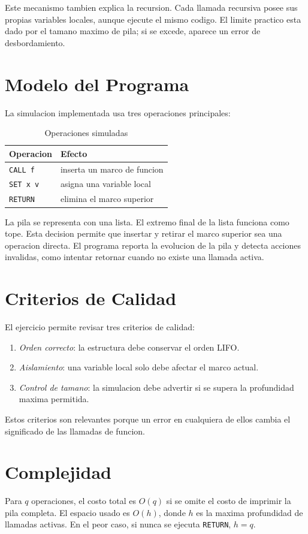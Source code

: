 \documentclass[conference]{IEEEtran}
\begin{document}
Este mecanismo tambien explica la recursion. Cada llamada recursiva posee sus
propias variables locales, aunque ejecute el mismo codigo. El limite practico
esta dado por el tamano maximo de pila; si se excede, aparece un error de
desbordamiento.

\section{Modelo del Programa}
La simulacion implementada usa tres operaciones principales:
\begin{table}[htbp]
\caption{Operaciones simuladas}
\centering
\begin{tabular}{ll}
\toprule
Operacion & Efecto \\
\midrule
\texttt{CALL f} & inserta un marco de funcion \\
\texttt{SET x v} & asigna una variable local \\
\texttt{RETURN} & elimina el marco superior \\
\bottomrule
\end{tabular}
\end{table}

La pila se representa con una lista. El extremo final de la lista funciona
como tope. Esta decision permite que insertar y retirar el marco superior sea
una operacion directa. El programa reporta la evolucion de la pila y detecta
acciones invalidas, como intentar retornar cuando no existe una llamada activa.

\section{Criterios de Calidad}
El ejercicio permite revisar tres criterios de calidad:
\begin{enumerate}
\item \textit{Orden correcto}: la estructura debe conservar el orden LIFO.
\item \textit{Aislamiento}: una variable local solo debe afectar el marco
actual.
\item \textit{Control de tamano}: la simulacion debe advertir si se supera la
profundidad maxima permitida.
\end{enumerate}
Estos criterios son relevantes porque un error en cualquiera de ellos cambia
el significado de las llamadas de funcion.

\section{Complejidad}
Para $q$ operaciones, el costo total es $O(q)$ si se omite el costo de imprimir
la pila completa. El espacio usado es $O(h)$, donde $h$ es la maxima
profundidad de llamadas activas. En el peor caso, si nunca se ejecuta
\texttt{RETURN}, $h=q$.
\end{document}
